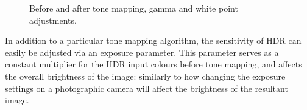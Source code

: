\documentclass[11pt, oneside]{report}
\begin{document}
\begin{figure}[!htbp]
  \centering
  \hfill
  \caption{Before and after \gls{tone mapping}, gamma and white point adjustments.}
\end{figure}

In addition to a particular \gls{tone mapping} algorithm, the sensitivity of \gls{HDR} can easily be adjusted via an exposure parameter. This parameter serves as a constant multiplier for the \gls{HDR} input colours before \gls{tone mapping}, and affects the overall brightness of the image: similarly to how changing the exposure settings on a photographic camera will affect the brightness of the resultant image.
\end{document}

